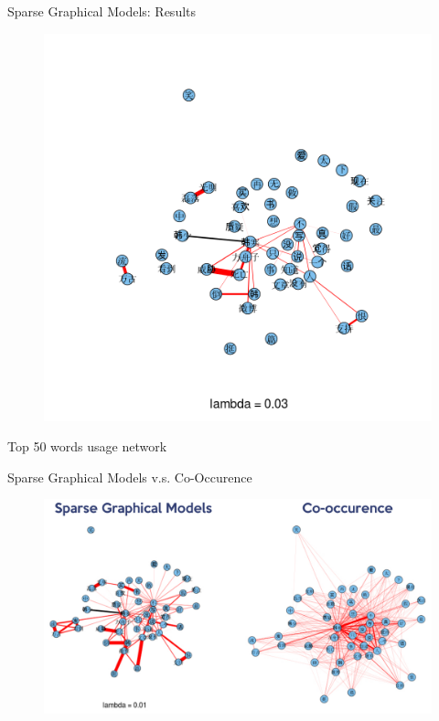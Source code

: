 \documentclass[12pt, trans]{beamer}
\newcommand{\1}[1]{{\mathbf 1}\left\{#1\right\}}        %
\begin{document}
\begin{frame}{Sparse Graphical Models: Results}

\begin{figure}
  \centering
  \includegraphics[height=0.9\textheight]{./../../gLassoResults/glasso6.png} 
\end{figure}
\center Top 50 words usage network

\end{frame}

\begin{frame}{Sparse Graphical Models v.s. Co-Occurence}

\begin{figure}
  \centering
  \includegraphics[scale=0.35]{sgmVScooc.pdf} 
\end{figure}

\end{frame}
\end{document}
